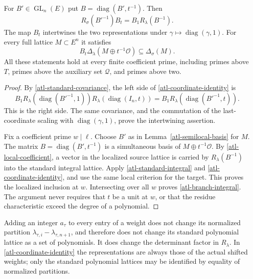 \begin{proposition}\label{atl-scaled-integrality}
For $B'\in\operatorname{GL}_n(E)$ put
$B=\operatorname{diag}(B',t^{-1})$.  Then
\begin{equation}\label{atl-coordinate-identity}
           R_\sigma(B'^{-1})B_t=B_1R_\lambda(B^{-1}).
\end{equation}
The map $B_t$ intertwines the two representations under
$\gamma\mapsto\operatorname{diag}(\gamma,1)$.
For every full lattice $M\subset E^n$ it satisfies
\begin{equation}\label{atl-branch-integral}
 B_t\Delta_\lambda(M\oplus t^{-1}\mathcal O)
                           \subseteq\Delta_\sigma(M).
\end{equation}
All these statements hold at every finite coefficient
prime, including primes above $T$, primes above the
auxiliary set $\mathcal Q$, and primes above two.
\end{proposition}
\begin{proof}
By \eqref{atl-standard-covariance}, the left side of
\eqref{atl-coordinate-identity} is
\[
 B_1R_\lambda(\operatorname{diag}(B'^{-1},1))
       R_\lambda(\operatorname{diag}(I_n,t))
                 =B_1R_\lambda(\operatorname{diag}(B'^{-1},t)).
\]
This is the right side.  The same covariance, and the
commutation of the last-coordinate scaling with
$\operatorname{diag}(\gamma,1)$, prove the intertwining
assertion.

Fix a coefficient prime $w\mid\ell$.  Choose $B'$ as
in Lemma~\ref{atl-semilocal-basis} for $M$.  The matrix
$B=\operatorname{diag}(B',t^{-1})$ is a simultaneous
basis of $M\oplus t^{-1}\mathcal O$.  By
\eqref{atl-local-coefficient}, a vector in the localized
source lattice is carried by $R_\lambda(B^{-1})$ into
the standard integral lattice.  Apply
\eqref{atl-standard-integral} and
\eqref{atl-coordinate-identity}, and use the same local
criterion for the target.  This proves the localized
inclusion at $w$.  Intersecting over all $w$ proves
\eqref{atl-branch-integral}.  The argument never requires
that $t$ be a unit at $w$, or that the residue
characteristic exceed the degree of a polynomial.
\end{proof}

Adding an integer $a_\tau$ to every entry of a weight
does not change its normalized partition
$\lambda_{\tau,i}-\lambda_{\tau,n+1}$, and therefore
does not change its standard polynomial lattice as a
set of polynomials.  It does change the determinant
factor in $R_\lambda$.  In \eqref{atl-coordinate-identity}
the representations are always those of the actual
shifted weights; only the standard polynomial lattices
may be identified by equality of normalized partitions.

